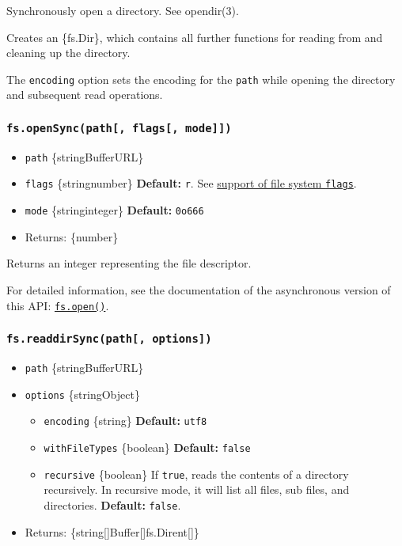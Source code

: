 Synchronously open a directory. See opendir(3).

Creates an \{fs.Dir\}, which contains all further functions for reading
from and cleaning up the directory.

The \texttt{encoding} option sets the encoding for the \texttt{path}
while opening the directory and subsequent read operations.

\subsubsection{\texorpdfstring{\texttt{fs.openSync(path{[},\ flags{[},\ mode{]}{]})}}{fs.openSync(path{[}, flags{[}, mode{]}{]})}}\label{fs.opensyncpath-flags-mode}

\begin{itemize}
\tightlist
\item
  \texttt{path} \{string\textbar Buffer\textbar URL\}
\item
  \texttt{flags} \{string\textbar number\} \textbf{Default:}
  \texttt{\textquotesingle{}r\textquotesingle{}}. See
  \hyperref[file-system-flags]{support of file system \texttt{flags}}.
\item
  \texttt{mode} \{string\textbar integer\} \textbf{Default:}
  \texttt{0o666}
\item
  Returns: \{number\}
\end{itemize}

Returns an integer representing the file descriptor.

For detailed information, see the documentation of the asynchronous
version of this API:
\hyperref[fsopenpath-flags-mode-callback]{\texttt{fs.open()}}.

\subsubsection{\texorpdfstring{\texttt{fs.readdirSync(path{[},\ options{]})}}{fs.readdirSync(path{[}, options{]})}}\label{fs.readdirsyncpath-options}

\begin{itemize}
\tightlist
\item
  \texttt{path} \{string\textbar Buffer\textbar URL\}
\item
  \texttt{options} \{string\textbar Object\}

  \begin{itemize}
  \tightlist
  \item
    \texttt{encoding} \{string\} \textbf{Default:}
    \texttt{\textquotesingle{}utf8\textquotesingle{}}
  \item
    \texttt{withFileTypes} \{boolean\} \textbf{Default:} \texttt{false}
  \item
    \texttt{recursive} \{boolean\} If \texttt{true}, reads the contents
    of a directory recursively. In recursive mode, it will list all
    files, sub files, and directories. \textbf{Default:} \texttt{false}.
  \end{itemize}
\item
  Returns: \{string{[}{]}\textbar Buffer{[}{]}\textbar fs.Dirent{[}{]}\}
\end{itemize}

